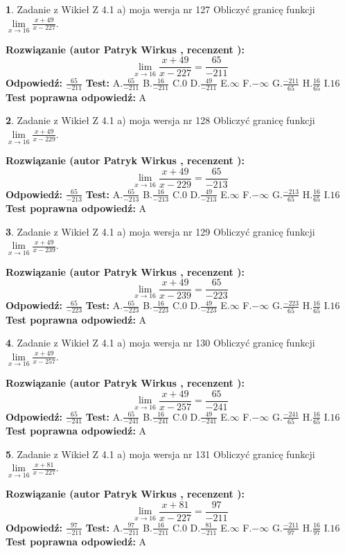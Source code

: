 \documentclass[12pt, a4paper]{article}
\theoremstyle{definition} %
\newtheorem{zad}{}
\newcommand{\zadStart}[1]{\begin{zad}#1\newline}
\newcommand{\zadStop}{\end{zad}}
\newcommand{\rozwStart}[2]{\noindent \textbf{Rozwiązanie (autor #1 , recenzent #2): }\newline}
\newcommand{\rozwStop}{\newline}
\newcommand{\odpStart}{\noindent \textbf{Odpowiedź:}\newline}
\newcommand{\odpStop}{\newline}
\newcommand{\testStart}{\noindent \textbf{Test:}\newline}
\newcommand{\testStop}{\newline}
\newcommand{\kluczStart}{\noindent \textbf{Test poprawna odpowiedź:}\newline}
\newcommand{\kluczStop}{\newline}
\begin{document}
\zadStart{Zadanie z Wikieł Z 4.1 a) moja wersja nr 127}
Obliczyć granicę funkcji $\lim\limits_{x\to16}\frac{x+49}{x-227}$.
\zadStop
\rozwStart{Patryk Wirkus}{}
$$\lim\limits_{x\to16}\frac{x+49}{x-227} = \frac{65}{-211}$$
\rozwStop
\odpStart
$\frac{65}{-211}$
\odpStop
\testStart
A.$\frac{65}{-211}$
B.$\frac{16}{-211}$
C.$0$
D.$\frac{49}{-211}$
E.$\infty$
F.$-\infty$
G.$\frac{-211}{65}$
H.$\frac{16}{65}$
I.$16$
\testStop
\kluczStart
A
\kluczStop



\zadStart{Zadanie z Wikieł Z 4.1 a) moja wersja nr 128}
Obliczyć granicę funkcji $\lim\limits_{x\to16}\frac{x+49}{x-229}$.
\zadStop
\rozwStart{Patryk Wirkus}{}
$$\lim\limits_{x\to16}\frac{x+49}{x-229} = \frac{65}{-213}$$
\rozwStop
\odpStart
$\frac{65}{-213}$
\odpStop
\testStart
A.$\frac{65}{-213}$
B.$\frac{16}{-213}$
C.$0$
D.$\frac{49}{-213}$
E.$\infty$
F.$-\infty$
G.$\frac{-213}{65}$
H.$\frac{16}{65}$
I.$16$
\testStop
\kluczStart
A
\kluczStop



\zadStart{Zadanie z Wikieł Z 4.1 a) moja wersja nr 129}
Obliczyć granicę funkcji $\lim\limits_{x\to16}\frac{x+49}{x-239}$.
\zadStop
\rozwStart{Patryk Wirkus}{}
$$\lim\limits_{x\to16}\frac{x+49}{x-239} = \frac{65}{-223}$$
\rozwStop
\odpStart
$\frac{65}{-223}$
\odpStop
\testStart
A.$\frac{65}{-223}$
B.$\frac{16}{-223}$
C.$0$
D.$\frac{49}{-223}$
E.$\infty$
F.$-\infty$
G.$\frac{-223}{65}$
H.$\frac{16}{65}$
I.$16$
\testStop
\kluczStart
A
\kluczStop



\zadStart{Zadanie z Wikieł Z 4.1 a) moja wersja nr 130}
Obliczyć granicę funkcji $\lim\limits_{x\to16}\frac{x+49}{x-257}$.
\zadStop
\rozwStart{Patryk Wirkus}{}
$$\lim\limits_{x\to16}\frac{x+49}{x-257} = \frac{65}{-241}$$
\rozwStop
\odpStart
$\frac{65}{-241}$
\odpStop
\testStart
A.$\frac{65}{-241}$
B.$\frac{16}{-241}$
C.$0$
D.$\frac{49}{-241}$
E.$\infty$
F.$-\infty$
G.$\frac{-241}{65}$
H.$\frac{16}{65}$
I.$16$
\testStop
\kluczStart
A
\kluczStop



\zadStart{Zadanie z Wikieł Z 4.1 a) moja wersja nr 131}
Obliczyć granicę funkcji $\lim\limits_{x\to16}\frac{x+81}{x-227}$.
\zadStop
\rozwStart{Patryk Wirkus}{}
$$\lim\limits_{x\to16}\frac{x+81}{x-227} = \frac{97}{-211}$$
\rozwStop
\odpStart
$\frac{97}{-211}$
\odpStop
\testStart
A.$\frac{97}{-211}$
B.$\frac{16}{-211}$
C.$0$
D.$\frac{81}{-211}$
E.$\infty$
F.$-\infty$
G.$\frac{-211}{97}$
H.$\frac{16}{97}$
I.$16$
\testStop
\kluczStart
A
\kluczStop
\end{document}
